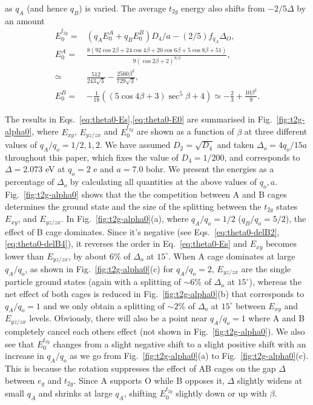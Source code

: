 \documentclass[a4paper,prb,twocolumn]{revtex4-1}  %
\newcommand{\rev}[1]{{\color{blue}{#1}}}
\begin{document}
  as $q_A$ (and hence $q_B$)
  is varied.
The average $t_{2g}$ energy
 also shifts from
$-2/5\Delta$ by an amount
\begin{align}
\label{eq:theta0-E0}
E_{0}^{t_{2g}} =& \left(q_A E_{0}^A + q_BE_{0}^B\right)D_4/a
-(2/5)f_{q_A}\Delta_{O},\\
E_{0}^A =&
 \frac{8 (92 \cos 2\beta+24 \cos 4\beta+20 \cos 6\beta+5 \cos 8\beta+51)}{9 (\cos 2\beta+2)^{9/2}},\\
 \simeq& \frac{512}{243 \sqrt{3}}-\frac{2560 \beta ^2}{729 \sqrt{3}},\\
E_{0}^B=&
 -\frac{1}{18} \left((5 \cos 4\beta+3) \sec ^5\beta+4\right)
 \simeq -\frac{2}{3}+\frac{10 \beta ^2}{9}.
 \end{align}
 
The results in Eqs.~\ref{eq:theta0-Es},\ref{eq:theta0-E0}
are summarised in Fig.~\ref{fig:t2g-alpha0},
where $E_{xy}$, $E_{yz/zx}$ and $E_0^{t_{2g}}$ are shown
as a function of $\beta$
at three different values of $q_A/q_o=1/2,1,2$.
We have 
assumed $D_2=\sqrt{D_4}$ and
taken $\Delta_o=4q_o/15a$ throughout this paper,
which fixes the value of $D_4=1/200$, 
and corresponds to $\Delta= 2.073$ eV at 
$q_o=2$ e and $a=7.0$ bohr.
We present the energies as a percentage of $\Delta_o$
by calculating all quantities at the above values of $q_o,a$.
Fig.~\ref{fig:t2g-alpha0} shows that
the the competition between A and B cages
determines the ground state and the size of the splitting between the 
$t_{2g}$ states
$E_{xy}$, and $E_{yz/zx}$.
In Fig.~\ref{fig:t2g-alpha0}(a),
where $q_A/q_o=1/2$ ($q_B/q_o=5/2$),
the effect of B cage dominates.
Since it's negative (see Eqs.~\ref{eq:theta0-delB2},\ref{eq:theta0-delB4}),
it reverses the order in Eq.~\ref{eq:theta0-Es}
and $E_{xy}$ becomes lower than $E_{yz/zx}$, by about $6\%$ of $\Delta_o$ at $15^\circ$.
When A cage dominates at large $q_A/q_o$,
as shown in Fig.~\ref{fig:t2g-alpha0}(c) for $q_A/q_o=2$,
$E_{yz/zx}$ are the single particle ground states (again with a splitting of $\sim6\%$ of $\Delta_o$ at $15^\circ$),
whereas the net effect of both cages
is reduced in Fig.~\ref{fig:t2g-alpha0}(b)
that corresponds to $q_A/q_o=1$
and we only obtain a splitting of $\sim2\%$ of $\Delta_o$ at $15^\circ$
between $E_{xy}$ and $E_{yz/zx}$ levels.
Obviously, there will also be a point near 
$q_A/q_o=1$ where A and B completely 
cancel each others effect (not shown in Fig.~\ref{fig:t2g-alpha0}).
We also see that $E_0^{t_{2g}}$ changes from a slight negative shift to a slight positive shift
with an increase in $q_A/q_o$ as we
go from Fig.~\ref{fig:t2g-alpha0}(a)
to Fig.~\ref{fig:t2g-alpha0}(c).
This is because the rotation suppresses the
effect of AB cages on the
gap $\Delta$ between $e_{g}$ and $t_{2g}$.
Since A supports O while B opposes it,
$\Delta$ slightly widens at small $q_A$ and shrinks at large $q_A$,
shifting $E_0^{t_{2g}}$ slightly down or up with $\beta$.
\end{document}
